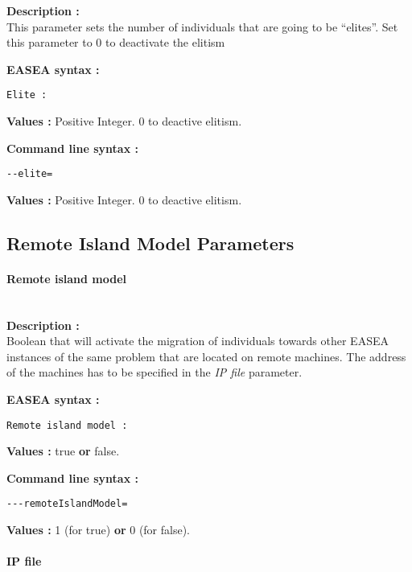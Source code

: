 \documentclass{book}
\begin{document}
\textbf{Description :}\\This parameter sets the number of individuals
that are going to be ``elites''. Set this parameter to 0 to deactivate
the elitism

\textbf{EASEA syntax :}

\texttt{Elite~:}

\textbf{Values :} Positive Integer. 0 to deactive elitism.

\textbf{Command line syntax :}

\texttt{-{}-elite=}

\textbf{Values :} Positive Integer. 0 to deactive elitism.

\subsection{Remote Island Model
Parameters}\label{remote-island-model-parameters}

\paragraph{Remote island model}\label{remote-island-model}
~\\

\textbf{Description :}\\Boolean that will activate the migration of
individuals towards other EASEA instances of the same problem that are
located on remote machines. The address of the machines has to be
specified in the \emph{IP file} parameter.

\textbf{EASEA syntax :}

\texttt{Remote~island~model~:}

\textbf{Values :} true \textbf{or} false.

\textbf{Command line syntax :}

\texttt{-{}-{}-remoteIslandModel=}

\textbf{Values :} 1 (for true) \textbf{or} 0 (for false).

\paragraph{IP file}\label{ip-file}
~\\
\end{document}

